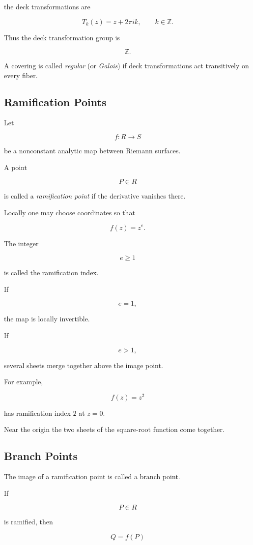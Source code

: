 \documentclass[12pt,a4paper]{article}
\theoremstyle{notespace}
\begin{document}
the deck transformations are

\[
T_k(z)=z+2\pi i k,
\qquad k\in\mathbb Z.
\]

Thus the deck transformation group is

\[
\mathbb Z.
\]

A covering is called \emph{regular} (or \emph{Galois}) if deck transformations act transitively on every fiber.

\subsection{Ramification Points}

Let

\[
f:R\to S
\]

be a nonconstant analytic map between Riemann surfaces.

A point

\[
P\in R
\]

is called a \emph{ramification point} if the derivative vanishes there.

Locally one may choose coordinates so that

\[
f(z)=z^e.
\]

The integer

\[
e\ge1
\]

is called the ramification index.

If

\[
e=1,
\]

the map is locally invertible.

If

\[
e>1,
\]

several sheets merge together above the image point.

For example,

\[
f(z)=z^2
\]

has ramification index \(2\) at \(z=0\).

Near the origin the two sheets of the square-root function come together.

\subsection{Branch Points}

The image of a ramification point is called a branch point.

If

\[
P\in R
\]

is ramified, then

\[
Q=f(P)
\]
\end{document}

